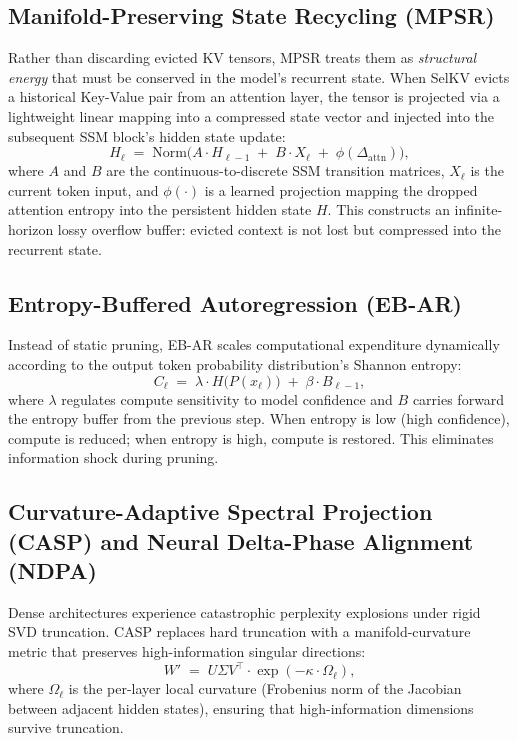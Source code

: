 \documentclass[11pt]{article}
\newcommand{\dsig}{\Delta}
\begin{document}
\subsection{Manifold-Preserving State Recycling (MPSR)}
Rather than discarding evicted KV tensors, MPSR treats them as \emph{structural
energy} that must be conserved in the model's recurrent state. When SelKV
evicts a historical Key-Value pair from an attention layer, the tensor is
projected via a lightweight linear mapping into a compressed state vector and
injected into the subsequent SSM block's hidden state update:
\begin{equation}\label{eq:mpsr}
  H_\ell \;=\; \mathrm{Norm}\bigl(A \cdot H_{\ell-1} \;+\; B \cdot X_\ell \;+\; \phi(\dsig_{\mathrm{attn}})\bigr),
\end{equation}
where $A$ and $B$ are the continuous-to-discrete SSM transition matrices,
$X_\ell$ is the current token input, and $\phi(\cdot)$ is a learned projection
mapping the dropped attention entropy into the persistent hidden state $H$.
This constructs an infinite-horizon lossy overflow buffer: evicted context is
not lost but compressed into the recurrent state.

\subsection{Entropy-Buffered Autoregression (EB-AR)}
Instead of static pruning, EB-AR scales computational expenditure dynamically
according to the output token probability distribution's Shannon entropy:
\begin{equation}\label{eq:ebar}
  C_\ell \;=\; \lambda \cdot H\!\bigl(P(x_\ell)\bigr) \;+\; \beta \cdot B_{\ell-1},
\end{equation}
where $\lambda$ regulates compute sensitivity to model confidence and $B$
carries forward the entropy buffer from the previous step. When entropy is
low (high confidence), compute is reduced; when entropy is high, compute is
restored. This eliminates information shock during pruning.

\subsection{Curvature-Adaptive Spectral Projection (CASP) and Neural Delta-Phase Alignment (NDPA)}
Dense architectures experience catastrophic perplexity explosions under rigid
SVD truncation. CASP replaces hard truncation with a manifold-curvature metric
that preserves high-information singular directions:
\begin{equation}\label{eq:casp}
  W' \;=\; U\Sigma V^{\top} \cdot \exp(-\kappa \cdot \Omega_\ell),
\end{equation}
where $\Omega_\ell$ is the per-layer local curvature (Frobenius norm of the
Jacobian between adjacent hidden states), ensuring that high-information
dimensions survive truncation.
\end{document}
